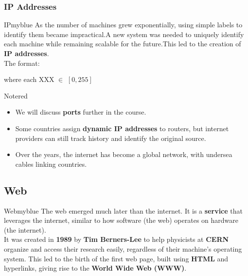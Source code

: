 \vspace{0.75cm}

\subsubsection{IP Addresses}  

\begin{prettyBox}{IP}{myblue}  
As the number of machines grew exponentially, using simple labels to identify
them became impractical.A new system was needed to uniquely identify 
each machine while remaining scalable for the future.This led to the
creation of \textbf{IP addresses}.\\[0.15cm]  
The format:  
\begin{center}  
     where each XXX \(\in\) \([0,255]\)  
\end{center}  
\end{prettyBox}  

\newpage


\begin{prettyBox}{Note}{red}  
\begin{itemize}  
    \item We will discuss \textbf{ports} further in the course.  
    \item Some countries assign \textbf{dynamic IP addresses} to routers,
but internet providers can still track history and identify the original source.  
    \item Over the years, the internet has become a global network,
with undersea cables linking countries.  
\end{itemize}  
\end{prettyBox} 

\vspace{0.35cm}


\subsection{Web}  
\begin{prettyBox}{Web}{myblue}  
    The web emerged much later than the internet. It is a \textbf{service} that leverages the internet,  
similar to how software (the web) operates on hardware (the internet).\\[0.15cm]  
It was created in \textbf{1989} by \textbf{Tim Berners-Lee} to help physicists at \textbf{CERN}  
organize and access their research easily, regardless of their machine's operating system.  
This led to the birth of the first web page, built using \textbf{HTML} and hyperlinks,  
giving rise to the \textbf{World Wide Web (WWW)}.  
\end{prettyBox}  

